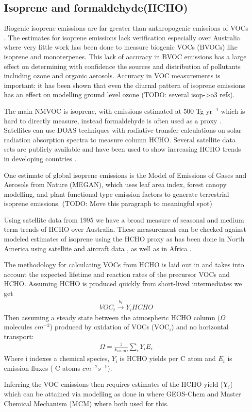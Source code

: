 \subsection{Isoprene and formaldehyde(HCHO)}

Biogenic isoprene emissions are far greater than anthropogenic emissions of VOCs \cite{Guenther_2006}. 
The estimates for isoprene emissions lack verification especially over Australia where very little work has been done to measure biogenic VOCs (BVOCs) like isoprene and monoterpenes.
This lack of accuracy in BVOC emissions has a large effect on determining with confidence the sources and distribution of pollutants including ozone and organic aerosols.
Accuracy in VOC measurements is important: it has been shown that even the diurnal pattern of isoprene emissions has an effect on modelling ground level ozone \cite{Hewitt_2011}(TODO: several isop->o3 refs).

The main NMVOC is isoprene, with emissions estimated at 500 Tg yr$^{-1}$ \cite{Guenther_2006} which is hard to directly measure, instead formaldehyde is often used as a proxy \cite{Marais_2012,bauwens2013satellite}.
Satellites can use DOAS techniques with radiative transfer calculations on solar radiation absorption spectra to measure column HCHO.
Several satellite data sets are publicly available and have been used to show increasing HCHO trends in developing countries \cite{Mahajan_2015}.

One estimate of global isoprene emissions is the Model of Emissions of Gases and Aerosols from Nature (MEGAN), which uses leaf area index, forest canopy modelling, and plant functional type emission factors to generate terrestrial isoprene emissions.
(TODO: Move this paragraph to meaningful spot)

Using satellite data from 1995 we have a broad measure of seasonal and medium term trends of HCHO over Australia.
These measurement can be checked against modeled estimates of isoprene using the HCHO proxy as has been done in North America using satellite and aircraft data \cite{Millet_2006}, as well as in Africa \cite{Marais_2014}.

The methodology for calculating VOCs from HCHO is laid out in \citet{Palmer_2003} and takes into account the expected lifetime and reaction rates of the precursor VOCs and HCHO.
Assuming HCHO is produced quickly from short-lived intermediates we get
\begin{eqnarray*}
VOC_i \overset{k_i}{\rightarrow} Y_i HCHO
\end{eqnarray*}
Then assuming a steady state between the atmospheric HCHO column ($\Omega$ molecules $cm^{-2}$)  produced by oxidation of VOCs (VOC$_i$) and no horizontal transport:
\begin{eqnarray*}
\Omega = \frac{1}{k_{HCHO}} \sum_{i} Y_i E_i
\end{eqnarray*}
Where i indexes a chemical species, $Y_i$ is HCHO yields per C atom and $E_i$ is emission fluxes ( C atoms $cm^{-2}s^{-1}$).

Inferring the VOC emissions then requires estimates of the HCHO yield (Y$_i$) which can be attained via modelling as done in \citet{Millet_2006} where GEOS-Chem and Master Chemical Mechanism (MCM) where both used for this.